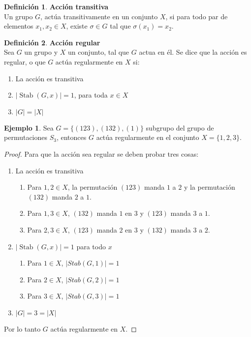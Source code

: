 \documentclass[11pt]{book}
\theoremstyle{definition}
\newtheorem{definition}{Definición}
\newtheorem{example}{Ejemplo}
\DeclareMathOperator{\Stab}{Stab}
\begin{document}
\begin{definition}\textbf{Acción transitiva}\\
  Un grupo $G$, actúa transitivamente en un conjunto $X$, si para todo
  par de elementos $x_1, x_2 \in X$, existe $\sigma \in G$ tal que $\sigma (x_1) = x_2$.
\end{definition}



\begin{definition}\textbf{Acción regular}\\
  Sea $G$ un grupo y $X$ un conjunto, tal que $G$ actua en él. Se dice que la acción es regular, o
  que $G$ actúa regularmente en $X$ si:
  \begin{enumerate}
  \item La acción es transitiva
  \item $|\Stab (G,x)|=1$, para toda $x\in X$
  \item $|G|=|X|$
  \end{enumerate}
\end{definition}


\begin{example}
  Sea $G=\{ (123),(132),(1)\}$ subgrupo del grupo de permutaciones $S_3$, entonces $G$
  actúa regularmente en el conjunto $X=\{ 1,2,3\}$.
\begin{proof} Para que la acción sea regular se deben probar tres cosas:

  \begin{enumerate}
  \item La acción es transitiva
    \begin{enumerate}
    \item Para $1,2\in X$, la permutación $(123)$ manda $1$ a $2$ y la
      permutación $(132)$ manda $2$ a $1$.
    \item Para $1,3\in X$, $(132)$ manda $1$ en $3$ y $(123)$ manda
      $3$ a $1$.
    \item Para $2,3\in X$, $(123)$ manda $2$ en $3$ y $(132)$ manda
      $3$ a $2$.
    \end{enumerate}
  \item $|\Stab (G,x)|=1$ para todo $x$
    \begin{enumerate}
    \item Para $1\in X$, $|Stab (G,1)|=1$
    \item Para $2\in X$, $|Stab (G,2)|=1$
    \item Para $3\in X$, $|Stab (G,3)|=1$
    \end{enumerate}
  \item $|G|=3=|X|$
  \end{enumerate}
  Por lo tanto $G$ actúa regularmente en $X$.
\end{proof}
\end{example}
\end{document}
